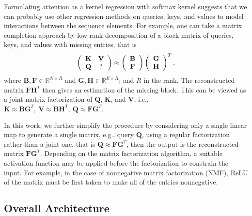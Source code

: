 \documentclass[a4,12pt]{article}
\begin{document}
	Formulating attention as a kernel regression with softmax kernel suggests that we can probably use other regression methods on queries, keys, and values to model interactions between the sequence elements. For example, one can take a matrix completion approach by low-rank decomposition of a block matrix of queries, keys, and values with missing entries, that is
	\begin{equation}
		\label{eq: matrix completion}
		\left(\begin{array}{c c}
			\mathbf{K} & \mathbf{V} \\
			\mathbf{Q} & ? \\
		\end{array}\right) \approx 	
		\left(\begin{array}{c}
			\mathbf{B} \\
			\mathbf{F} \\
		\end{array}\right)
		\left(\begin{array}{c}
			\mathbf{G} \\
			\mathbf{H} \\
		\end{array}\right)^T,
	\end{equation}
	where $ \mathbf{B}, \mathbf{F} \in \mathbb{R}^{N \times R} $ and $ \mathbf{G}, \mathbf{H} \in \mathbb{R}^{E \times R} $; and $ R $ in the rank. The reconstructed matrix $ \mathbf{F}\mathbf{H}^T $ then gives an estimation of the missing block. This can be viewed as a joint matrix factorization of $ \mathbf{Q} $, $ \mathbf{K} $, and $ \mathbf{V} $, i.e., $ \mathbf{K} \approx \mathbf{B}\mathbf{G}^T, \ \mathbf{V} \approx \mathbf{B}\mathbf{H}^T, \ \mathbf{Q} \approx \mathbf{F}\mathbf{G}^T $.
	
	In this work, we further simplify the procedure by considering only a single linear map to generate a single matrix, e.g., query $ \mathbf{Q} $, using a regular factorization rather than a joint one, that is $ \mathbf{Q} \approx \mathbf{F}\mathbf{G}^T $, then the output is the reconstructed matrix $ \mathbf{F}\mathbf{G}^T $. Depending on the matrix factorization algorithm, a suitable activation function may be applied before the factorization to constrain the input. For example, in the case of nonnegative matrix factorization (NMF), ReLU of the matrix must be first taken to make all of the entries nonnegative.
	
	
	
	
	\subsection{Overall Architecture} \label{sec: architecture}
	
\end{document}
